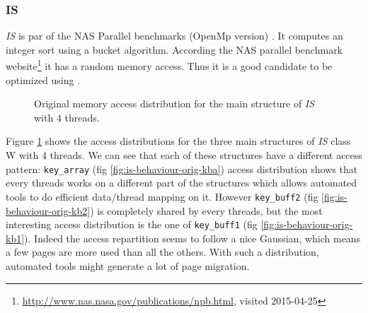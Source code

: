 \subsubsection{IS}
\label{sec:exp-is}

\emph{IS} is par of the NAS Parallel benchmarks (OpenMp version)
\cite{Feng04Unstructured}.  It computes an integer sort using a bucket
algorithm. According the NAS parallel benchmark
website\footnote{\url{http://www.nas.nasa.gov/publications/npb.html}, visited
2015-04-25} it has a random memory access. Thus it is a good candidate to be
optimized using \TABARNAC.

\begin{figure}[htb]
    \centering

    \caption{Original memory access distribution for the main structure of
        \emph{IS} with $4$ threads.}
    \label{fig:is-behaviour-orig}
\end{figure}

Figure \ref{fig:is-behaviour-orig} shows the access distributions for the
three main structures of \emph{IS} class W with $4$ threads. We can see that
each of these structures have a different access pattern: \texttt{key\_array}
(fig \ref{fig:is-behaviour-orig-kba}) access distribution shows that every
threads works on a different part of the structures which allows automated
tools to do efficient data/thread mapping on it. However \texttt{key\_buff2}
(fig \ref{fig:is-behaviour-orig-kb2}) is completely shared by every threads,
but the most interesting access distribution is the one of \texttt{key\_buff1}
(fig \ref{fig:is-behaviour-orig-kb1}). Indeed the access repartition seems to
follow a nice Gaussian, which means a few pages are more used than all the
others. With such a distribution, automated tools might generate a lot of page
migration.




